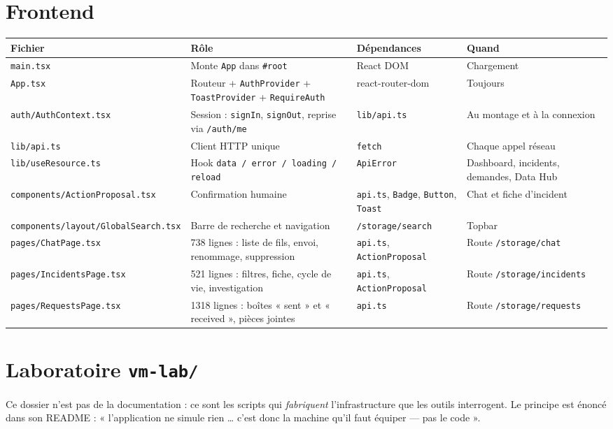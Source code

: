 \documentclass[11pt,a4paper]{report}
\newcommand{\file}[1]{\texttt{\small #1}}
\newcommand{\fn}[1]{\texttt{\small\textcolor{oasisviolet}{#1}}}
\newcommand{\cls}[1]{\texttt{\small\textcolor{oasisblue}{#1}}}
\newcommand{\route}[1]{\texttt{\small\textcolor{oasisgreen}{#1}}}
\begin{document}
\section{Frontend}

\begin{longtable}{@{}p{3.4cm}p{4.2cm}p{3.4cm}p{3.2cm}@{}}
\toprule
\textbf{Fichier} & \textbf{Rôle} & \textbf{Dépendances} & \textbf{Quand}\\
\midrule
\endhead
\file{main.tsx} & Monte \cls{App} dans \texttt{\#root} & React DOM & Chargement\\
\file{App.tsx} & Routeur + \cls{AuthProvider} + \cls{ToastProvider} + \cls{RequireAuth} & react-router-dom & Toujours\\
\file{auth/AuthContext.tsx} & Session : \fn{signIn}, \fn{signOut}, reprise via \route{/auth/me} & \file{lib/api.ts} & Au montage et à la connexion\\
\file{lib/api.ts} & Client HTTP unique & \texttt{fetch} & Chaque appel réseau\\
\file{lib/useResource.ts} & Hook \texttt{data / error / loading / reload} & \cls{ApiError} & Dashboard, incidents, demandes, Data Hub\\
\file{components/ActionProposal.tsx} & Confirmation humaine & \file{api.ts}, \cls{Badge}, \cls{Button}, \cls{Toast} & Chat et fiche d'incident\\
\file{components/layout/GlobalSearch.tsx} & Barre de recherche et navigation & \route{/storage/search} & Topbar\\
\file{pages/ChatPage.tsx} & 738 lignes : liste de fils, envoi, renommage, suppression & \file{api.ts}, \cls{ActionProposal} & Route \route{/storage/chat}\\
\file{pages/IncidentsPage.tsx} & 521 lignes : filtres, fiche, cycle de vie, investigation & \file{api.ts}, \cls{ActionProposal} & Route \route{/storage/incidents}\\
\file{pages/RequestsPage.tsx} & 1318 lignes : boîtes « sent » et « received », pièces jointes & \file{api.ts} & Route \route{/storage/requests}\\
\bottomrule
\end{longtable}

\section{Laboratoire \file{vm-lab/}}

Ce dossier n'est pas de la documentation : ce sont les scripts qui
\emph{fabriquent} l'infrastructure que les outils interrogent. Le principe est
énoncé dans son README : « l'application ne simule rien \ldots{} c'est donc la
machine qu'il faut équiper --- pas le code ».
\end{document}

